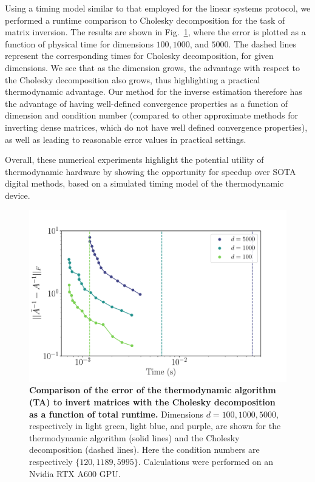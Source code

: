 \documentclass[prx,onecolumn,floatfix,longbibliography,notitlepage, nofootinbib]{revtex4-1}
\begin{document}
Using a timing model similar to that employed for the linear systems protocol, we performed a runtime comparison to Cholesky decomposition for the task of matrix inversion. The results are shown in Fig.~\ref{fig:inverse_estim_comparison_d}, where the error is plotted as a function of physical time for dimensions $100, 1000$, and $5000$. The dashed lines represent the corresponding times for Cholesky decomposition, for given dimensions. We see that as the dimension grows, the advantage with respect to the Cholesky decomposition also grows, thus highlighting a practical thermodynamic advantage. Our method for the inverse estimation therefore has the advantage of having well-defined convergence properties as a function of dimension and condition number (compared to other approximate methods for inverting dense matrices, which do not have well defined convergence properties), as well as leading to reasonable error values in practical settings.

Overall, these numerical experiments highlight the potential utility of thermodynamic hardware by showing the opportunity for speedup over SOTA digital methods, based on a simulated timing model of the thermodynamic device. 


\begin{figure}[t]
   \centering
\includegraphics[width=0.6\linewidth]{figures/error_vs_time_inverse.pdf}
   \caption{\textbf{Comparison of the error of the thermodynamic algorithm (TA) to invert matrices with the Cholesky decomposition as a function of total runtime.} Dimensions $d = 100, 1000, 5000$, respectively in light green, light blue, and purple, are shown for the thermodynamic algorithm (solid lines) and the Cholesky decomposition (dashed lines). Here the condition numbers are respectively $\{120, 1189, 5995\}$. Calculations were performed on an Nvidia RTX A600 GPU.}
\label{fig:inverse_estim_comparison_d}
\end{figure}
\end{document}
